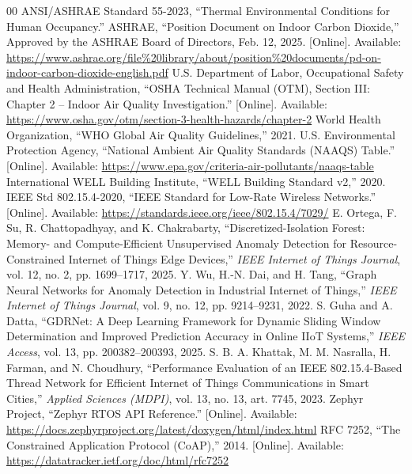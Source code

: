 \documentclass[conference]{IEEEtran}
\begin{document}
\footnotesize
\begin{thebibliography}{00}
\setlength{\itemsep}{0pt}
\setlength{\parskip}{0pt}
\setlength{\parsep}{0pt}
 ANSI/ASHRAE Standard 55-2023, ``Thermal Environmental Conditions for Human Occupancy.''
 ASHRAE, ``Position Document on Indoor Carbon Dioxide,'' Approved by the ASHRAE Board of Directors, Feb. 12, 2025. [Online]. Available: \url{https://www.ashrae.org/file%20library/about/position%20documents/pd-on-indoor-carbon-dioxide-english.pdf}
 U.S. Department of Labor, Occupational Safety and Health Administration, ``OSHA Technical Manual (OTM), Section III: Chapter 2 -- Indoor Air Quality Investigation.'' [Online]. Available: \url{https://www.osha.gov/otm/section-3-health-hazards/chapter-2}
 World Health Organization, ``WHO Global Air Quality Guidelines,'' 2021.
 U.S. Environmental Protection Agency, ``National Ambient Air Quality Standards (NAAQS) Table.'' [Online]. Available: \url{https://www.epa.gov/criteria-air-pollutants/naaqs-table}
 International WELL Building Institute, ``WELL Building Standard v2,'' 2020.
 IEEE Std 802.15.4-2020, ``IEEE Standard for Low-Rate Wireless Networks.'' [Online]. Available: \url{https://standards.ieee.org/ieee/802.15.4/7029/}
 E. Ortega, F. Su, R. Chattopadhyay, and K. Chakrabarty, ``Discretized-Isolation Forest: Memory- and Compute-Efficient Unsupervised Anomaly Detection for Resource-Constrained Internet of Things Edge Devices,'' \textit{IEEE Internet of Things Journal}, vol. 12, no. 2, pp. 1699--1717, 2025.
 Y. Wu, H.-N. Dai, and H. Tang, ``Graph Neural Networks for Anomaly Detection in Industrial Internet of Things,'' \textit{IEEE Internet of Things Journal}, vol. 9, no. 12, pp. 9214--9231, 2022.
 S. Guha and A. Datta, ``GDRNet: A Deep Learning Framework for Dynamic Sliding Window Determination and Improved Prediction Accuracy in Online IIoT Systems,'' \textit{IEEE Access}, vol. 13, pp. 200382--200393, 2025.
 S. B. A. Khattak, M. M. Nasralla, H. Farman, and N. Choudhury, ``Performance Evaluation of an IEEE 802.15.4-Based Thread Network for Efficient Internet of Things Communications in Smart Cities,'' \textit{Applied Sciences (MDPI)}, vol. 13, no. 13, art. 7745, 2023.
 Zephyr Project, ``Zephyr RTOS API Reference.'' [Online]. Available: \url{https://docs.zephyrproject.org/latest/doxygen/html/index.html}
 RFC 7252, ``The Constrained Application Protocol (CoAP),'' 2014. [Online]. Available: \url{https://datatracker.ietf.org/doc/html/rfc7252}

\end{thebibliography}
\end{document}
